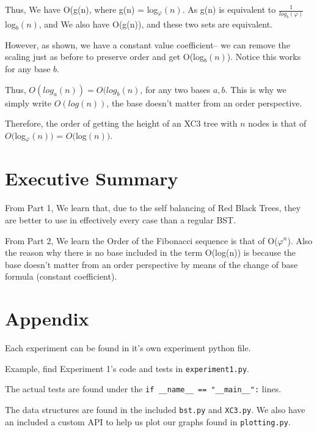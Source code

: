 \documentclass{article}
\begin{document}
Thus, We have O(g(n), where g(n) = log$_{\varphi}(n)$. As g(n) is equivalent to $\frac{1}{log_{b}(\varphi)}$log$_{b}(n)$, and We also have O(g(n)), and these two sets are equivalent. 

However, as shown, we have a constant value coefficient-- we can remove the scaling just as before to preserve order and get O(log$_{b}(n)$). Notice this works for any base $b$.

Thus, $O(log_{a}(n)) = O(log_{b}(n)$, for any two bases $a, b$. This is why we simply write $O(log(n))$, the base doesn't matter from an order perspective.

Therefore, the order of getting the height of an XC3 tree with $n$ nodes is that of $O($log$_{\varphi}(n))$ = $O($log$(n))$.


\section{Executive Summary}

From Part 1, We learn that, due to the self balancing of Red Black Trees, they are better to use in effectively every case than a regular BST.

From Part 2, We learn the Order of the Fibonacci sequence is that of O($\varphi^{n}$). Also the reason why there is no base included in the term O(log(n)) is because the base doesn't matter from an order perspective by means of the change of base formula (constant coefficient).


\newpage
\section{Appendix}

Each experiment can be found in it's own experiment python file. 

Example, find Experiment 1's code and tests in \verb|experiment1.py|.

The actual tests are found under the \verb|if __name__ == "__main__":| lines.

The data structures are found in the included \verb|bst.py| and \verb|XC3.py|. We also have an included a custom API to help us plot our graphs found in \verb|plotting.py|.
\end{document}
